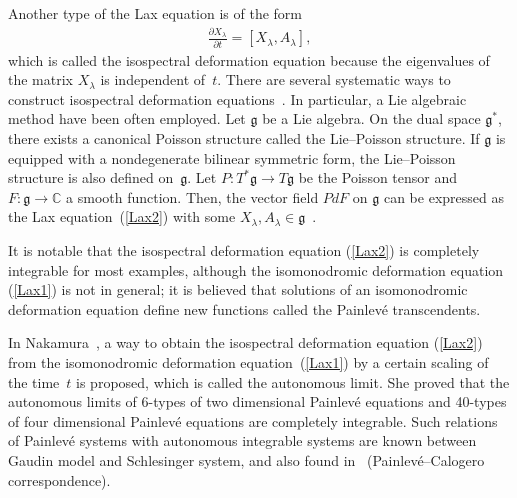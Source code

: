 \documentclass[pdftex]{sigma}
\numberwithin{equation}{section}
\begin{document}
Another type of the Lax equation is of the form
\begin{gather}
\frac{\partial X_\lambda }{\partial t} = [X_\lambda , A_\lambda ],\label{Lax2}
\end{gather}
which is called the isospectral deformation equation because the eigenvalues of the matrix $X_\lambda $ is independent of~$t$. There are several systematic ways to construct isospectral deformation equations~\cite{AMV}. In particular, a Lie algebraic method have been often employed. Let $\mathfrak{g}$ be a Lie algebra. On the dual space $\mathfrak{g}^*$, there exists a canonical Poisson structure called the Lie--Poisson structure. If $\mathfrak{g}$ is equipped with a nondegenerate bilinear symmetric form, the Lie--Poisson structure is also def\/ined on~$\mathfrak{g}$. Let $P \colon T^*\mathfrak{g} \to T\mathfrak{g}$ be the Poisson tensor and $F \colon \mathfrak{g} \to \mathbb{C}$ a smooth function. Then, the vector f\/ield $PdF$ on $\mathfrak{g}$ can be expressed as the Lax equation~(\ref{Lax2}) with some $X_\lambda , A_\lambda \in \mathfrak{g}$~\cite{AMV}.

It is notable that the isospectral deformation equation (\ref{Lax2}) is completely integrable for most examples, although the isomonodromic deformation equation (\ref{Lax1}) is not in general; it is believed that solutions of an isomonodromic deformation equation def\/ine new functions called the Painlev\'{e} transcendents.

In Nakamura~\cite{Nak}, a way to obtain the isospectral deformation equation (\ref{Lax2}) from the isomonodromic deformation equation~(\ref{Lax1}) by a certain scaling of the time~$t$ is proposed, which is called the autonomous limit. She proved that the autonomous limits of 6-types of two dimensional Painlev\'{e} equations and 40-types of four dimensional Painlev\'{e} equations are completely integrable. Such relations of Painlev\'{e} systems with autonomous integrable systems are known between Gaudin model and Schlesinger system, and also found in~\cite{LO} (Painlev\'{e}--Calogero correspondence).
\end{document}
